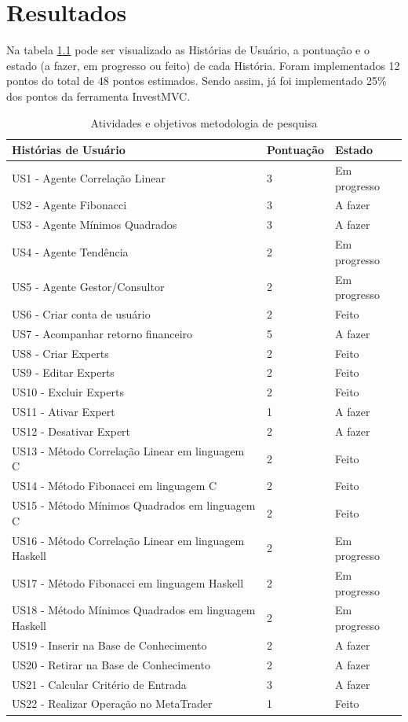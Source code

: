 \chapter{Resultados}

Na tabela \ref{estadoAtual} pode ser visualizado as Histórias de Usuário, a pontuação e o estado (a fazer, em progresso ou feito) de cada História. Foram implementados 12 pontos do total de 48 pontos estimados. Sendo assim, já foi implementado 25\% dos pontos da ferramenta InvestMVC.

\begin{table}[htp]
\caption{Atividades e objetivos metodologia de pesquisa}
\begin{center}
    \begin{tabular}{ | p{5cm} | p{4cm} | p{4cm}|}
    \hline
    \textbf{Histórias de Usuário} & \textbf{Pontuação} & \textbf{Estado} \\ \hline

US1 - Agente Correlação Linear & 3 & Em progresso\\ \hline
US2 - Agente Fibonacci & 3 & A fazer \\ \hline
US3 - Agente Mínimos Quadrados & 3 & A fazer\\ \hline
US4 -  Agente Tendência & 2 & Em progresso\\ \hline
US5 - Agente Gestor/Consultor & 2& Em progresso\\ \hline
US6 - Criar conta de usuário & 2 & Feito\\ \hline
US7 - Acompanhar retorno financeiro & 5 & A fazer\\ \hline
US8 - Criar Experts & 2 & Feito\\ \hline
US9 - Editar Experts & 2 & Feito\\ \hline
US10 - Excluir Experts & 2 & Feito\\ \hline
US11 - Ativar Expert & 1 & A fazer\\ \hline
US12 - Desativar Expert & 2 & A fazer \\ \hline
US13 - Método Correlação Linear em linguagem C & 2 & Feito\\ \hline
US14 - Método Fibonacci em linguagem C & 2 & Feito\\ \hline
US15 - Método Mínimos Quadrados em linguagem C & 2 & Feito\\ \hline
US16 - Método Correlação Linear em linguagem Haskell & 2 & Em progresso\\ \hline
US17 - Método Fibonacci em linguagem Haskell & 2 & Em progresso\\ \hline
US18 - Método Mínimos Quadrados em linguagem Haskell & 2 & Em progresso\\ \hline
US19 - Inserir na Base de Conhecimento & 2 & A fazer\\ \hline
US20 - Retirar na Base de Conhecimento & 2 & A fazer\\ \hline
US21 - Calcular Critério de Entrada & 3 & A fazer\\ \hline
US22 - Realizar Operação no MetaTrader& 1 & Feito\\ \hline
\end{tabular}
\end{center}
\label{estadoAtual}
\end{table}

